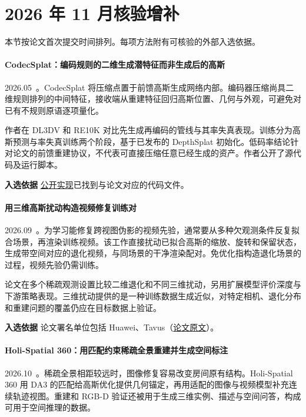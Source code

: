 \section{2026 年 11 月核验增补}

本节按论文首次提交时间排列。每项方法附有可核验的外部入选依据。

\paragraph{CodecSplat：编码规则的二维生成潜特征而非生成后的高斯}
2026.05~\cite{2605_25563}。CodecSplat 将压缩点置于前馈高斯生成网络内部。编码器压缩尚具二维规则排列的中间特征，接收端从重建特征回归高斯位置、几何与外观，可避免对已有不规则原语逐项量化。

作者在 DL3DV 和 RE10K 对比先生成再编码的管线与其率失真表现。训练分为高斯预测与率失真训练两个阶段，基于已发布的 DepthSplat 初始化。低码率结论针对论文的前馈重建协议，不代表可直接压缩任意已经生成的资产。作者公开了源代码及运行脚本。

\textbf{入选依据} \href{https://github.com/pengpeng-yu/codecsplat}{公开实现}已找到与论文对应的代码文件。

\paragraph{用三维高斯扰动构造视频修复训练对}
2026.09~\cite{2609_03657}。为学习能修复跨视图伪影的视频先验，通常要从多种欠观测条件反复拟合场景，再渲染训练视频。该工作直接扰动已拟合高斯的缩放、旋转和保留状态，生成带空间对应的退化视频，与同场景的干净渲染配对。免优化指构造退化场景的过程，视频先验仍需训练。

论文在多个稀疏观测设置比较二维退化和不同三维扰动，另用扩展模型评价深度与下游策略表现。三维扰动提供的是一种训练数据生成近似，对特定相机、退化分布和重建问题的覆盖仍应在目标数据上验证。

\textbf{入选依据} 论文署名单位包括 Huawei、Tavus（\href{https://arxiv.org/abs/2609.03657}{论文原文}）。

\paragraph{Holi-Spatial 360：用匹配约束稀疏全景重建并生成空间标注}
2026.10~\cite{2610_19502}。稀疏全景相距较远时，图像修复容易改变房间原有结构。Holi-Spatial 360 用 DA3 的匹配给高斯优化提供几何锚定，再用适配的图像与视频模型补充连续轨迹视图。重建和 RGB-D 验证还被用于生成三维实例、描述与空间问答，构成可用于空间推理的数据。

